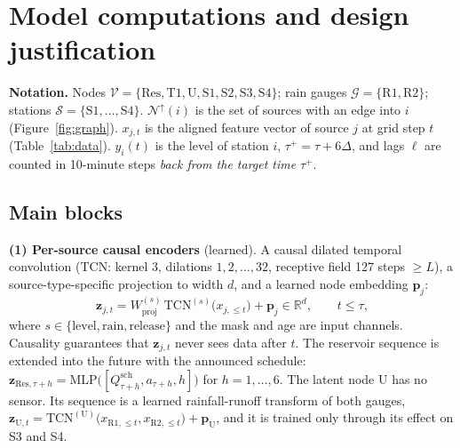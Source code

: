 \section{Model computations and design justification}
\textbf{Notation.} Nodes $\mathcal{V}=\{\mathrm{Res},\mathrm{T1},\mathrm{U},\mathrm{S1},\mathrm{S2},\mathrm{S3},\mathrm{S4}\}$;
rain gauges $\mathcal{G}=\{\mathrm{R1},\mathrm{R2}\}$; stations $\mathcal{S}=\{\mathrm{S1},\dots,\mathrm{S4}\}$.
$\mathcal{N}^{\uparrow}(i)$ is the set of sources with an edge into $i$ (Figure~\ref{fig:graph}).
$x_{j,t}$ is the aligned feature vector of source $j$ at grid step $t$ (Table~\ref{tab:data}).
$y_i(t)$ is the level of station $i$, $\tau^{+}=\tau+6\Delta$, and lags $\ell$ are counted in
10-minute steps \emph{back from the target time} $\tau^{+}$.

\subsection*{Main blocks}
\textbf{(1) Per-source causal encoders} (learned). A causal dilated temporal convolution (TCN:
kernel 3, dilations $1,2,\dots,32$, receptive field 127 steps $\ge L$), a source-type-specific
projection to width $d$, and a learned node embedding $\mathbf{p}_j$:
\begin{equation}
\mathbf{z}_{j,t}=W^{(s)}_{\mathrm{proj}}\,\mathrm{TCN}^{(s)}\!\big(x_{j,\le t}\big)+\mathbf{p}_j\in\mathbb{R}^{d},\qquad t\le\tau ,
\end{equation}
where $s\in\{\text{level},\text{rain},\text{release}\}$ and the mask and age are input channels.
Causality guarantees that $\mathbf{z}_{j,t}$ never sees data after $t$. The reservoir sequence is
extended into the future with the announced schedule:
$\mathbf{z}_{\mathrm{Res},\tau+h}=\mathrm{MLP}\big([Q^{\mathrm{sch}}_{\tau+h},a_{\tau+h},h]\big)$ for $h=1,\dots,6$.
The latent node U has no sensor. Its sequence is a learned rainfall-runoff transform of both
gauges, $\mathbf{z}_{\mathrm{U},t}=\mathrm{TCN}^{(\mathrm{U})}\big(x_{\mathrm{R1},\le t},x_{\mathrm{R2},\le t}\big)+\mathbf{p}_{\mathrm{U}}$,
and it is trained only through its effect on S3 and S4.

